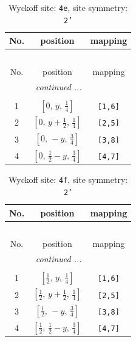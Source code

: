 \documentclass[fleqn,8pt]{jsarticle}
\begin{document}
\renewcommand{\arraystretch}{1.2}
\begin{longtable}{ccc}
\caption{Wyckoff site: {\tt 4e}, site symmetry: {\tt 2'}}
 \\
 \hline \hline
No. & position & mapping \\ \hline \endfirsthead

\multicolumn{2}{l}{\tablename\ \thetable{}} \\
 \hline \hline
No. & position & mapping \\ \hline \endhead

 \hline \hline
\multicolumn{2}{r}{\footnotesize\it continued ...} \\ \endfoot

 \hline \hline
\multicolumn{2}{r}{} \\ \endlastfoot

1 & $\left[ 0,\, y,\, \frac{1}{4} \right]$ & {\tt [1,6]} \\ \hline
2 & $\left[ 0,\, y + \frac{1}{2},\, \frac{1}{4} \right]$ & {\tt [2,5]} \\ \hline
3 & $\left[ 0,\, - y,\, \frac{3}{4} \right]$ & {\tt [3,8]} \\ \hline
4 & $\left[ 0,\, \frac{1}{2} - y,\, \frac{3}{4} \right]$ & {\tt [4,7]} \\
\end{longtable}
\renewcommand{\arraystretch}{1.2}
\begin{longtable}{ccc}
\caption{Wyckoff site: {\tt 4f}, site symmetry: {\tt 2'}}
 \\
 \hline \hline
No. & position & mapping \\ \hline \endfirsthead

\multicolumn{2}{l}{\tablename\ \thetable{}} \\
 \hline \hline
No. & position & mapping \\ \hline \endhead

 \hline \hline
\multicolumn{2}{r}{\footnotesize\it continued ...} \\ \endfoot

 \hline \hline
\multicolumn{2}{r}{} \\ \endlastfoot

1 & $\left[ \frac{1}{2},\, y,\, \frac{1}{4} \right]$ & {\tt [1,6]} \\ \hline
2 & $\left[ \frac{1}{2},\, y + \frac{1}{2},\, \frac{1}{4} \right]$ & {\tt [2,5]} \\ \hline
3 & $\left[ \frac{1}{2},\, - y,\, \frac{3}{4} \right]$ & {\tt [3,8]} \\ \hline
4 & $\left[ \frac{1}{2},\, \frac{1}{2} - y,\, \frac{3}{4} \right]$ & {\tt [4,7]} \\
\end{longtable}
\end{document}
